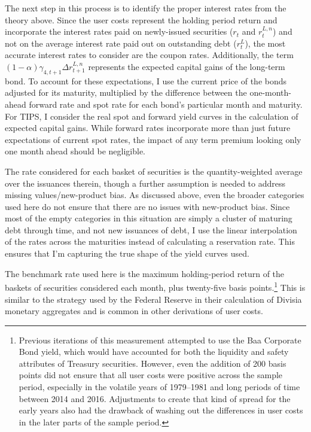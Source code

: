 \documentclass[11pt,a4paper,margin=1.5in]{article}
\begin{document}
The next step in this process is to identify the proper interest rates from the theory above.
Since the user costs represent the holding period return and incorporate the interest rates paid on newly-issued securities ($r_t$ and $r^{L,n}_t$) and not on the average interest rate paid out on outstanding debt ($r^L_t$), the most accurate interest rates to consider are the coupon rates.
Additionally, the term $(1-\alpha)\gamma_{4,t+1}\Delta r^{L,n}_{t+1}$ represents the expected capital gains of the long-term bond. 
To account for these expectations, I use the current price of the bonds adjusted for its maturity, multiplied by the difference between the one-month-ahead forward rate and spot rate for each bond's particular month and maturity.
For TIPS, I consider the real spot and forward yield curves in the calculation of expected capital gains. 
While forward rates incorporate more than just future expectations of current spot rates, the impact of any term premium looking only one month ahead should be negligible.

The rate considered for each basket of securities is the quantity-weighted average over the issuances therein, though a further assumption is needed to address missing values/new-product bias.
As discussed above, even the broader categories used here do not ensure that there are no issues with new-product bias.
Since most of the empty categories in this situation are simply a cluster of maturing debt through time, and not new issuances of debt, I use the linear interpolation of the rates across the maturities instead of calculating a reservation rate.
This ensures that I'm capturing the true shape of the yield curves used. 

The benchmark rate used here is the maximum holding-period return of the baskets of securities considered each month, plus twenty-five basis points.\footnote{
	Previous iterations of this measurement attempted to use the Baa Corporate Bond yield, which would have accounted for both the liquidity and safety attributes of Treasury securities.
	However, even the addition of 200 basis points did not ensure that all user costs were positive across the sample period, especially in the volatile years of 1979--1981 and long periods of time between 2014 and 2016.
	Adjustments to create that kind of spread for the early years also had the drawback of washing out the differences in user costs in the later parts of the sample period.}
This is similar to the strategy used by the Federal Reserve in their calculation of Divisia monetary aggregates and is common in other derivations of user costs. 
\end{document}
